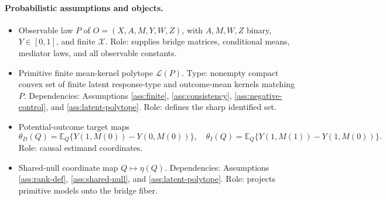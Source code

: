 \documentclass[11pt]{article}
\newcommand{\E}{\mathbb{E}}
\theoremstyle{definition}
\theoremstyle{plain}
\theoremstyle{remark}
\begin{document}
\paragraph{Probabilistic assumptions and objects.}
\begin{itemize}[leftmargin=*]
\item Observable law \(P\) of \(O=(X,A,M,Y,W,Z)\), with \(A,M,W,Z\) binary,
\(Y\in[0,1]\), and finite \(\mathcal X\).  Role: supplies bridge matrices,
conditional means, mediator laws, and all observable constants.
\item Primitive finite mean-kernel polytope \(\mathcal L(P)\).  Type:
nonempty compact convex set of finite latent response-type and outcome-mean
kernels matching \(P\).  Dependencies: Assumptions \ref{ass:finite},
\ref{ass:consistency}, \ref{ass:negative-control}, and
\ref{ass:latent-polytope}.  Role: defines the sharp identified set.
\item Potential-outcome target maps
\[
  \theta_D(Q)=\E_Q\{Y(1,M(0))-Y(0,M(0))\},
  \quad
  \theta_I(Q)=\E_Q\{Y(1,M(1))-Y(1,M(0))\}.
\]
Role: causal estimand coordinates.
\item Shared-null coordinate map \(Q\mapsto\eta(Q)\).  Dependencies:
Assumptions \ref{ass:rank-def}, \ref{ass:shared-null}, and
\ref{ass:latent-polytope}.  Role: projects primitive models onto the bridge
fiber.
\end{itemize}
\end{document}
